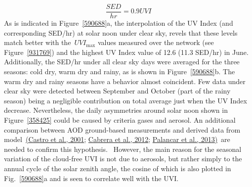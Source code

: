 \documentclass[10pt]{article}
\begin{document}
\[\frac{SED}{hr}=0.9UVI\]As is indicated in
Figure~{\ref{590688}}a, the interpolation of the UV
Index (and corresponding SED/hr) at solar noon under clear sky, revels
that these levels match better with the~\(UVI_{\max}\) values
measured over the network (see Figure~{\ref{931769}})
and the highest UV Index value of 12.6 (11.3 SED/hr) in June.
Additionally, the SED/hr under all clear sky days were averaged for the
three seasons: cold dry, warm dry and rainy, as is shown in
Figure~{\ref{590688}}b. The warm dry and rainy seasons
have a behavior almost coincident. Few data under clear sky were
detected between September and October (part of the rainy season) being
a negligible contribution on total average just when the UV Index
decrease. Nevertheless, the daily asymmetries around solar noon shown in
Figure~{\ref{358425}} could be caused by criteria gases
and aerosol. An additional comparison between AOD ground-based
measurements and derived data from model~\hyperref[csl:14]{(Castro et al., 2001}; \hyperref[csl:69]{Cabrera et al., 2012}; \hyperref[csl:13]{Palancar et al., 2013)}~are needed
to confirm this hypothesis.~ However, the main reason for the seasonal
variation of the cloud-free UVI is not due to aerosols, but rather
simply to the annual cycle of the solar zenith angle, the cosine of
which is also plotted in Fig.~{\ref{590688}}a and is
seen to correlate well with the UVI. ~
\end{document}
